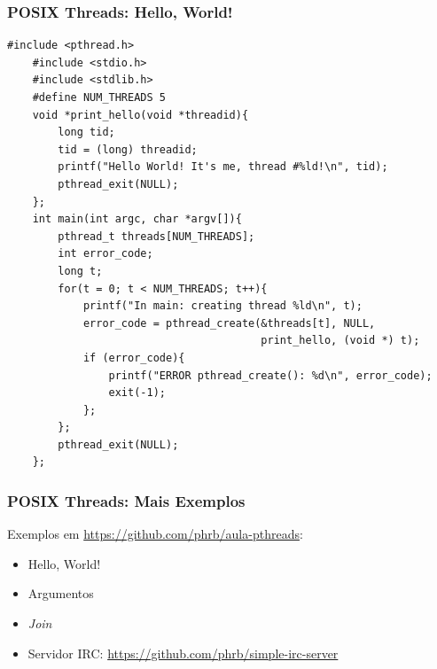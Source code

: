 \documentclass[10pt, compress]{beamer}
\begin{document}
\begin{frame}[fragile]
    \frametitle{POSIX Threads: Hello, World!}
    \begin{lstlisting}[basicstyle=\ttfamily\scriptsize]
    #include <pthread.h>
    #include <stdio.h>
    #include <stdlib.h>
    #define NUM_THREADS 5
    void *print_hello(void *threadid){
        long tid;
        tid = (long) threadid;
        printf("Hello World! It's me, thread #%ld!\n", tid);
        pthread_exit(NULL);
    };
    int main(int argc, char *argv[]){
        pthread_t threads[NUM_THREADS];
        int error_code;
        long t;
        for(t = 0; t < NUM_THREADS; t++){
            printf("In main: creating thread %ld\n", t);
            error_code = pthread_create(&threads[t], NULL,
                                        print_hello, (void *) t);
            if (error_code){
                printf("ERROR pthread_create(): %d\n", error_code);
                exit(-1);
            };
        };
        pthread_exit(NULL);
    };
    \end{lstlisting}
\end{frame}

\begin{frame}
    \frametitle{POSIX Threads: Mais Exemplos}
    Exemplos em \url{https://github.com/phrb/aula-pthreads}:
    \begin{itemize}
        \item Hello, World!
        \item Argumentos
        \item \textit{Join}
        \item Servidor IRC: \url{https://github.com/phrb/simple-irc-server}
    \end{itemize}
\end{frame}

\maketitle
\end{document}
